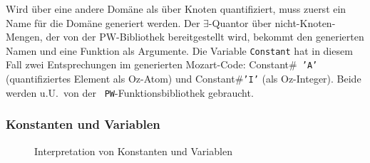 Wird \"uber eine andere Dom\"ane als \"uber Knoten quantifiziert, muss
zuerst ein Name f\"ur die Dom\"ane generiert werden. Der
$\exists$-Quantor \"uber nicht-Knoten-Mengen, der von der
PW-Bibliothek bereitgestellt wird, bekommt den generierten Namen und
eine Funktion als Argumente. Die Variable {\tt Constant} hat in diesem
Fall zwei Entsprechungen im generierten Mozart-Code: Constant\#{\tt
  'A'} (quantifiziertes Element als Oz-Atom) und Constant\#{\tt 'I'}
(als Oz-Integer). Beide werden u.U.\ von der {\tt
  PW}-Funktionsbibliothek gebraucht.

\subsubsection{Konstanten und Variablen}

\begin{figure}
\caption{Interpretation von Konstanten und Variablen}
\label{consem}
\end{figure}

